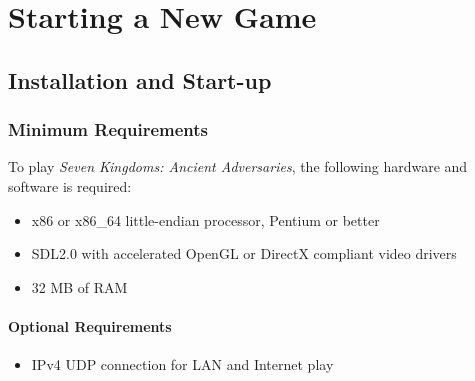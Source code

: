 
\chapter{Starting a New Game}

\section{Installation and Start-up}


\subsection{Minimum Requirements}

To play \textit{Seven Kingdoms: Ancient Adversaries}, the following hardware and software is required:

\begin{itemize}
	\item x86 or x86\_64 little-endian processor, Pentium or better
	\item SDL2.0 with accelerated OpenGL or DirectX compliant video drivers
	\item 32 MB of RAM
\end{itemize}

\subsubsection{Optional Requirements}

\begin{itemize}
	\item IPv4 UDP connection for LAN and Internet play
\end{itemize}

